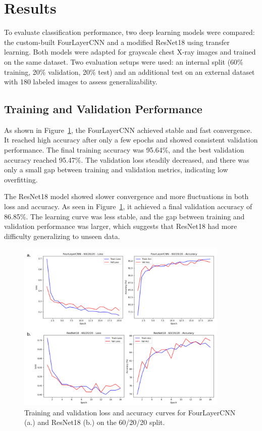 \documentclass[a4paper,11pt]{article}
\begin{document}
\section{Results}

To evaluate classification performance, two deep learning models were compared: the custom-built FourLayerCNN and a modified ResNet18 using transfer learning. Both models were adapted for grayscale chest X-ray images and trained on the same dataset. Two evaluation setups were used: an internal split (60\% training, 20\% validation, 20\% test) and an additional test on an external dataset with 180 labeled images to assess generalizability.

\subsection{Training and Validation Performance}

As shown in Figure~\ref{fig:training_curves}, the FourLayerCNN achieved stable and fast convergence. It reached high accuracy after only a few epochs and showed consistent validation performance. The final training accuracy was 95.64\%, and the best validation accuracy reached 95.47\%. The validation loss steadily decreased, and there was only a small gap between training and validation metrics, indicating low overfitting.

\vspace{0.2cm}The ResNet18 model showed slower convergence and more fluctuations in both loss and accuracy. As seen in Figure~\ref{fig:training_curves}, it achieved a final validation accuracy of 86.85\%. The learning curve was less stable, and the gap between training and validation performance was larger, which suggests that ResNet18 had more difficulty generalizing to unseen data.

\begin{figure}[H]
    \centering
    \includegraphics[width=0.90\textwidth]{./Figures/1.png} %
    \caption[Training and validation curves of CNN and ResNet18]{
    Training and validation loss and accuracy curves for FourLayerCNN (a.) and ResNet18 (b.) on the 60/20/20 split.
    }
    \label{fig:training_curves}
\end{figure}
\end{document}
